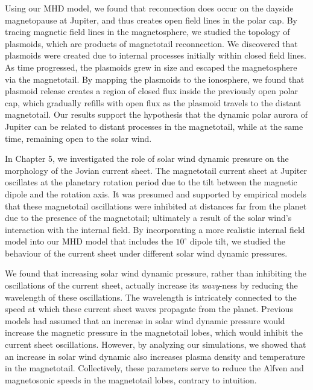 Using our MHD model, we found that reconnection does occur on the dayside magnetopause at Jupiter, and thus creates open field lines in the polar cap. By tracing magnetic field lines in the magnetosphere, we studied the topology of plasmoids, which are products of magnetotail reconnection. We discovered that plasmoids were created due to internal processes initially within closed field lines. As time progressed, the plasmoids grew in size and escaped the magnetosphere via the magnetotail. By mapping the plasmoids to the ionosphere, we found that plasmoid release creates a region of closed flux inside the previously open polar cap, which gradually refills with open flux as the plasmoid travels to the distant magnetotail. Our results support the hypothesis that the dynamic polar aurora of Jupiter can be related to distant processes in the magnetotail, while at the same time, remaining open to the solar wind. 

In Chapter 5, we investigated the role of solar wind dynamic pressure on the morphology of the Jovian current sheet. The magnetotail current sheet at Jupiter oscillates at the planetary rotation period due to the tilt between the magnetic dipole and the rotation axis. It was presumed and supported by empirical models that these magnetotail oscillations were inhibited at distances far from the planet due to the presence of the magnetotail; ultimately a result of the solar wind's interaction with the internal field. By incorporating a more realistic internal field model into our MHD model that includes the $10^\circ$ dipole tilt, we studied the behaviour of the current sheet under different solar wind dynamic pressures. 

We found that increasing solar wind dynamic pressure, rather than inhibiting the oscillations of the current sheet, actually increase its \emph{wavy}-ness by reducing the wavelength of these oscillations. The wavelength is intricately connected to the speed at which these current sheet waves propagate from the planet. Previous models had assumed that an increase in solar wind dynamic pressure would increase the magnetic pressure in the magnetotail lobes, which would inhibit the current sheet oscillations. However, by analyzing our simulations, we showed that an increase in solar wind dynamic also increases plasma density and temperature in the magnetotail. Collectively, these parameters serve to reduce the Alfven and magnetosonic speeds in the magnetotail lobes, contrary to intuition.


